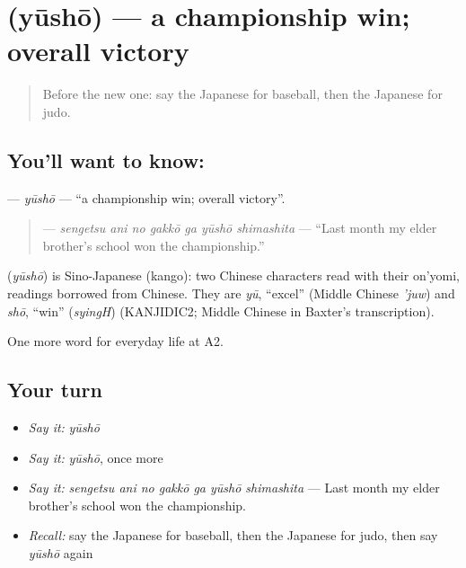 \section[\texorpdfstring{\ja{ゆうしょう} (yūshō)}{ゆうしょう (yūshō)}]{ (yūshō) — a championship win; overall victory}

\label{lesson:JA-C235-yuushou}



\begin{quote}
Before the new one: say the Japanese for baseball, then the Japanese for judo.
\end{quote}

\subsection*{You'll want to know: }
\textbf{} — \emph{yūshō} — \textquotedblleft{}a championship win; overall victory\textquotedblright{}.

\begin{quote}
\textbf{   } — \emph{sengetsu ani no gakkō ga yūshō shimashita} — \textquotedblleft{}Last month my elder brother's school won the championship.\textquotedblright{}
\end{quote}

\begin{cousinweb}
\textbf{} (\emph{yūshō}) is Sino-Japanese (kango): two Chinese characters read with their on'yomi, readings borrowed from Chinese. They are \emph{yū}, \textquotedblleft{}excel\textquotedblright{} (Middle Chinese \emph{'juw}) and \emph{shō}, \textquotedblleft{}win\textquotedblright{} (\emph{syingH}) (KANJIDIC2; Middle Chinese in Baxter's transcription).
\end{cousinweb}

\begin{grammarlens}[title={What you've built}]
One more word for everyday life at A2.
\end{grammarlens}

\subsection*{Your turn}
\begin{itemize}
\raggedright
  \item \emph{Say it:} \emph{yūshō}
  \item \emph{Say it:} \emph{yūshō}, once more
  \item \emph{Say it:} \emph{sengetsu ani no gakkō ga yūshō shimashita} — Last month my elder brother's school won the championship.
  \item \emph{Recall:} say the Japanese for baseball, then the Japanese for judo, then say \emph{yūshō} again
\end{itemize}

